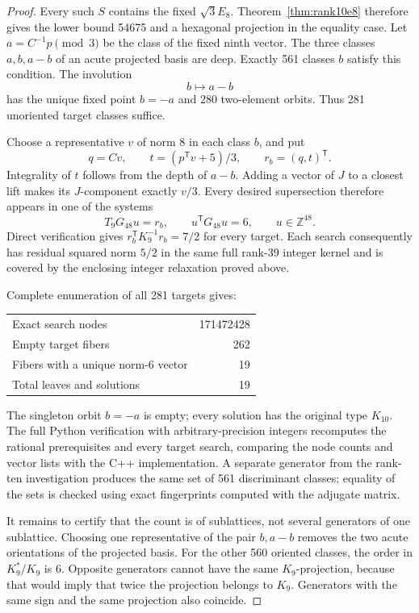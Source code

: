 \documentclass[11pt,a4paper]{article}
\theoremstyle{remark}\newtheorem{remark}[theorem]{Remark}
\newcommand{\Z}{\mathbb Z}\newcommand{\R}{\mathbb R}\newcommand{\F}{\mathbb F}
\begin{document}
\begin{proof}
Every such $S$ contains the fixed $\sqrt3E_8$. Theorem~\ref{thm:rank10e8} therefore gives the lower bound 54675 and a hexagonal projection in the equality case. Let $a=C^{-1}p\pmod3$ be the class of the fixed ninth vector. The three classes $a,b,a-b$ of an acute projected basis are deep. Exactly 561 classes $b$ satisfy this condition. The involution
\[
b\longmapsto a-b
\]
has the unique fixed point $b=-a$ and 280 two-element orbits. Thus 281 unoriented target classes suffice.

Choose a representative $v$ of norm 8 in each class $b$, and put
\[
q=Cv,\qquad t=(p^{\mathsf T}v+5)/3,\qquad r_b=(q,t)^{\mathsf T}.
\]
Integrality of $t$ follows from the depth of $a-b$. Adding a vector of $J$ to a closest lift makes its $J$-component exactly $v/3$. Every desired supersection therefore appears in one of the systems
\[
T_9G_{48}u=r_b,\qquad u^{\mathsf T}G_{48}u=6,\qquad u\in\Z^{48}.
\]
Direct verification gives $r_b^{\mathsf T}K_9^{-1}r_b=7/2$ for every target. Each search consequently has residual squared norm $5/2$ in the same full rank-39 integer kernel and is covered by the enclosing integer relaxation proved above.

Complete enumeration of all 281 targets gives:
\begin{center}
\begin{tabular}{lr}
\toprule
Exact search nodes &171472428\\
Empty target fibers &262\\
Fibers with a unique norm-6 vector &19\\
Total leaves and solutions &19\\
\bottomrule
\end{tabular}
\end{center}
The singleton orbit $b=-a$ is empty; every solution has the original type $K_{10}$. The full Python verification with arbitrary-precision integers recomputes the rational prerequisites and every target search, comparing the node counts and vector lists with the C++ implementation. A separate generator from the rank-ten investigation produces the same set of 561 discriminant classes; equality of the sets is checked using exact fingerprints computed with the adjugate matrix.

It remains to certify that the count is of sublattices, not several generators of one sublattice. Choosing one representative of the pair $b,a-b$ removes the two acute orientations of the projected basis. For the other 560 oriented classes, the order in $K_9^*/K_9$ is 6. Opposite generators cannot have the same $K_9$-projection, because that would imply that twice the projection belongs to $K_9$. Generators with the same sign and the same projection also coincide.


\end{proof}
\end{document}
